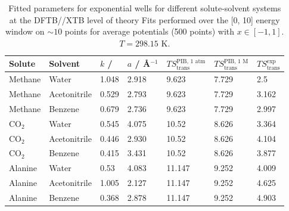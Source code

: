 \documentclass[../main.tex]{subfiles}
\begin{document}
\begin{table}[h!]
	\renewcommand{\arraystretch}{1.5}
	\begin{center}
		\small
		\begin{tabularx}{\textwidth}{YYYYYYY} 
			\toprule
			Solute & Solvent& $k$ / \kcal & $a$ / \AA$^{-1}$ & $TS_\text{trans}^\text{PIB, 1 atm}$ &  $TS_\text{trans}^\text{PIB, 1 M}$ & $TS_\text{trans}^\text{exp}$ \\
			\hline
			
			Methane  & Water & 1.048 & 2.918& 9.623  &  7.729  &  2.5 \\
			Methane  & Acetonitrile & 0.529 & 2.793 & 9.623  &  7.729  &  3.162\\
			Methane  & Benzene & 0.679& 2.736 &9.623  &  7.729  &  2.997\\
			CO$_2$  & Water&  0.545 & 4.075 &10.52  &  8.626  &  3.364\\
			CO$_2$  & Acetonitrile& 0.446& 2.930 &10.52  &  8.626  &  4.104\\
			CO$_2$  & Benzene & 0.415 &3.431 &10.52  &  8.626  &  3.877\\
			Alanine   &Water & 0.53 & 4.083 &11.147  &  9.252  &  4.009\\
			Alanine   & Acetonitrile&1.005 & 2.127 &11.147  &  9.252  &  4.625\\
			Alanine   & Benzene & 0.368 & 2.878 &11.147  &  9.252  &  4.903\\
			\bottomrule
		\end{tabularx}
	\end{center}
	\caption{Fitted parameters for exponential wells for different solute-solvent systems at the DFTB//XTB level of theory Fits performed over the [0, 10] \kcal energy window on $\sim 10$ points for average potentials (500 points) with $x \in [-1, 1]$. $T = 298.15$ K.} 
	\label{table::figX9_params}
\end{table}
\end{document}
